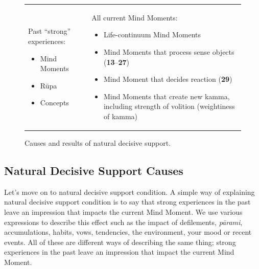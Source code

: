 \begin{figure}[H]
\begin{tabular*}{\textwidth}{L{\tabcolsep} | L{\tabcolsep}}
\toprule
{} &  \\
\midrule

Past “strong” experiences:
\begin{itemize}
\item Mind Moments
\item Rūpa
\item Concepts
\end{itemize}

&
All current Mind Moments:
\begin{itemize}
\item Life-continuum Mind Moments
\item Mind Moments that process sense objects (\textbf{13}--\textbf{27})
\item Mind Moment that decides reaction (\textbf{29})
\item Mind Moments that create new kamma, including strength of volition (weightiness of kamma)\vspace*{-\baselineskip}
\end{itemize}

\\

\bottomrule

\end{tabular*}
\caption{Causes and results of natural decisive support.}
\label{fig:NDS}
\end{figure}

\subsection*{Natural Decisive Support Causes}

Let’s move on to natural decisive support condition. A simple way of explaining natural decisive support condition is to say that strong experiences in the past leave an impression that impacts the current Mind Moment. We use various expressions to describe this effect such as the impact of defilements, \textit{pārami}, accumulations, habits, vows, tendencies, the environment, your mood or recent events. All of these are different ways of describing the same thing; strong experiences in the past leave an impression that impact the current Mind Moment.

